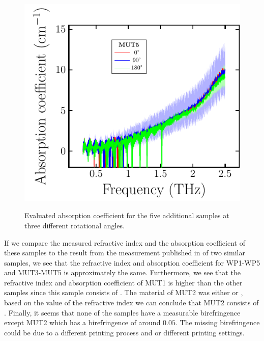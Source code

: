 \begin{figure}[H]
\subcaptionbox{\label{fig:ceramic_MUT5_abs}}
    {\includegraphics[width=0.45\linewidth]{images/appendix/plots/real_abs/MUT5.pdf}}
\caption{Evaluated absorption coefficient for the five additional samples at three different rotational angles.}
\label{fig:ceramic_MUTs_abs}
\end{figure}

If we compare the measured refractive index and the absorption coefficient of these  samples to the result from the measurement published in \cite{Ornik2018} of two similar  samples, we see that the refractive index and absorption coefficient for WP1-WP5 and MUT3-MUT5 is approximately the same. Furthermore, we see that the refractive index and absorption coefficient of MUT1 is higher than the other samples since this sample consists of . The material of MUT2 was either  or , based on the value of the refractive index we can conclude that MUT2 consists of . Finally, it seems that none of the samples have a measurable birefringence except MUT2 which has a birefringence of around $0.05$. The missing birefringence could be due to a different printing process and or different printing settings.
